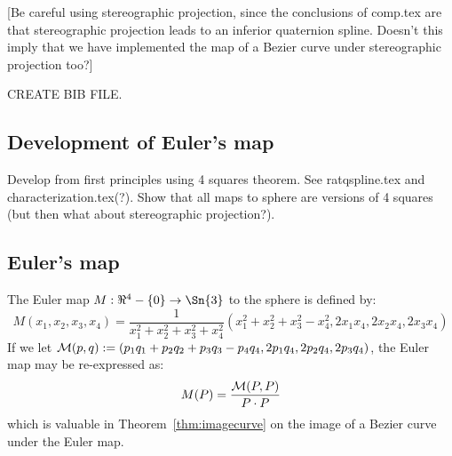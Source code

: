 \documentclass[11pt]{article}
\begin{document}

[Be careful using stereographic projection, since the conclusions of comp.tex are that
stereographic projection leads to an inferior quaternion spline.
Doesn't this imply that we have implemented the map of a Bezier curve under
stereographic projection too?]

CREATE BIB FILE.

\subsection{Development of Euler's map}

Develop from first principles using 4 squares theorem.
See ratqspline.tex and characterization.tex(?).
Show that all maps to sphere are versions of 4 squares (but then what about stereographic
projection?).

\subsection{Euler's map}

\begin{defn2}
The Euler map $M: \Re^4 - \{0\} \rightarrow \Sn{3}$ to the sphere is defined by:
\begin{equation}
\label{eqM}
	M(x_1,x_2,x_3,x_4) =
	\frac{1}{x_1^2 + x_2^2 + x_3^2 + x_4^2}
	(x_1^2 + x_2^2 + x_3^2 - x_4^2, 2x_1x_4, 2x_2x_4, 2x_3x_4)
\end{equation}
%
If we let 
${\cal M}(p,q): = (p_1q_1 + p_2q_2 + p_3q_3 - p_4q_4, 2p_1q_4, 2p_2q_4, 2p_3q_4)$,
the Euler map may be re-expressed as:
\begin{equation}
\label{eq:calM}
M(P) = \frac{{\cal M}(P,P)}{P \cdot P}
\end{equation}
which is valuable in Theorem~\ref{thm:imagecurve} on the image of a Bezier curve
under the Euler map.
\end{defn2}
\end{document}
